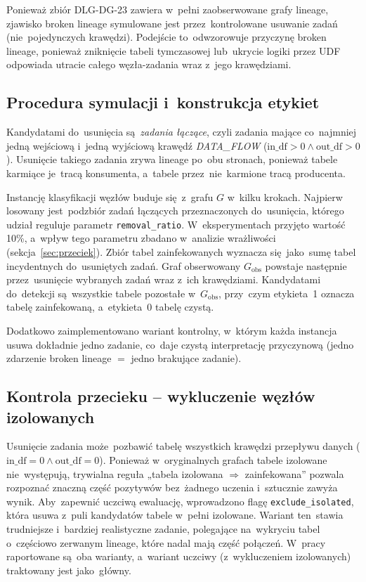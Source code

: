 Ponieważ zbiór DLG-DG-23 zawiera w~pełni zaobserwowane grafy lineage,
zjawisko broken lineage symulowane jest przez~kontrolowane usuwanie
zadań (nie~pojedynczych krawędzi). Podejście to~odwzorowuje
przyczynę broken lineage, ponieważ zniknięcie tabeli tymczasowej lub~ukrycie
logiki przez UDF odpowiada utracie całego węzła-zadania wraz z~jego krawędziami.

\subsection{Procedura symulacji i~konstrukcja etykiet}
\label{sec:procedura-symulacji}

Kandydatami do~usunięcia są~\emph{zadania łączące}, czyli zadania mające
co~najmniej jedną wejściową i~jedną wyjściową krawędź \emph{DATA\_FLOW}
($\mathrm{in\_df} > 0 \land \mathrm{out\_df} > 0$). Usunięcie takiego zadania
zrywa lineage po~obu stronach, ponieważ tabele karmiące je~tracą konsumenta,
a~tabele przez~nie~karmione tracą producenta.

Instancję klasyfikacji węzłów buduje się~z~grafu $G$ w~kilku krokach.
Najpierw losowany jest~podzbiór zadań łączących przeznaczonych do~usunięcia,
którego udział reguluje parametr \texttt{removal\_ratio}. W~eksperymentach
przyjęto wartość 10\%, a~wpływ tego parametru zbadano w~analizie wrażliwości
(sekcja~\ref{sec:przeciek}). Zbiór tabel zainfekowanych wyznacza się~jako~sumę
tabel incydentnych do~usuniętych zadań. Graf obserwowany $G_{\mathrm{obs}}$
powstaje następnie przez~usunięcie wybranych zadań wraz z~ich krawędziami.
Kandydatami do~detekcji są~wszystkie tabele pozostałe w~$G_{\mathrm{obs}}$,
przy~czym etykieta~1 oznacza tabelę zainfekowaną, a~etykieta~0 tabelę czystą.

Dodatkowo zaimplementowano wariant kontrolny, w~którym każda instancja
usuwa dokładnie jedno zadanie, co~daje czystą interpretację
przyczynową (jedno zdarzenie broken lineage $=$ jedno brakujące zadanie).

\subsection{Kontrola przecieku – wykluczenie węzłów izolowanych}
\label{sec:exclude-isolated}

Usunięcie zadania może~pozbawić tabelę wszystkich krawędzi
przepływu danych ($\mathrm{in\_df} = 0 \land \mathrm{out\_df} = 0$).
Ponieważ w~oryginalnych grafach tabele izolowane nie~występują, trywialna
reguła „tabela izolowana $\Rightarrow$ zainfekowana'' pozwala rozpoznać
znaczną część pozytywów bez~żadnego uczenia i~sztucznie zawyża wynik.
Aby~zapewnić uczciwą ewaluację, wprowadzono flagę \texttt{exclude\_isolated},
która usuwa z~puli kandydatów tabele w~pełni izolowane. Wariant ten~stawia
trudniejsze i~bardziej realistyczne zadanie, polegające na~wykryciu tabel
o~częściowo zerwanym lineage, które nadal mają część połączeń. W~pracy raportowane
są~oba warianty, a~wariant uczciwy (z~wykluczeniem izolowanych) traktowany
jest jako~główny.

